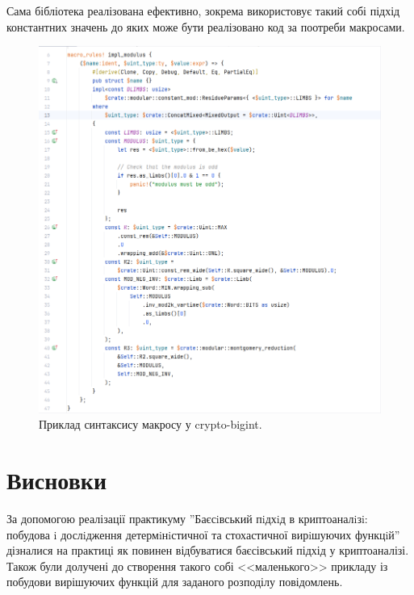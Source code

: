 Сама бібліотека реалізована ефективно, зокрема використовує такий собі підхід константних значень до яких може бути реалізовано код за поотреби макросами.



\begin{figure}[h]
    \centering
    \includegraphics[scale = 0.25]{Images/crypto-bigint-macros_mod}
    \caption{Приклад синтаксису макросу у crypto-bigint.}
    \label{fig:crypto-bigint-macros_mod}
\end{figure}















\section{Висновки}
За допомогою реалізації практикуму ''Баєсiвський пiдхiд в криптоаналiзi: побудова i дослiдження детермiнiстичної та стохастичної вирiшуючих функцiй'' дізналися на практиці як повинен відбуватися баєсівський підхід у криптоаналізі. Також були долучені до створення такого собі <<маленького>> прикладу із побудови вирішуючих функцій для заданого розподілу повідомлень.
